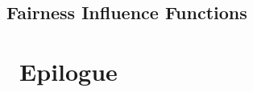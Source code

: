 \chapter{Fairness Influence Functions}				




	





\part{~Epilogue}

\printbibliography[heading=bibintoc]


\appendix




